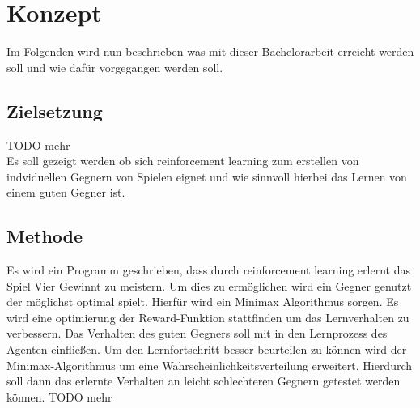 \chapter{Konzept}%

\label{cha:Konzept}

Im Folgenden wird nun beschrieben was mit dieser Bachelorarbeit erreicht werden soll und wie dafür vorgegangen werden soll.

\section{Zielsetzung}
\colorbox{red!30}{TODO mehr}\\
Es soll gezeigt werden ob sich reinforcement learning zum erstellen von indviduellen Gegnern von Spielen eignet und wie sinnvoll hierbei das Lernen von einem guten Gegner ist. \\

\section{Methode}
Es wird ein Programm geschrieben, dass durch reinforcement learning erlernt das Spiel Vier Gewinnt zu meistern. Um dies zu ermöglichen wird ein Gegner genutzt der möglichst optimal spielt. Hierfür wird ein Minimax Algorithmus sorgen. Es wird eine optimierung der Reward-Funktion stattfinden um das Lernverhalten zu verbessern. Das Verhalten des guten Gegners soll mit in den Lernprozess des Agenten einfließen. Um den Lernfortschritt besser beurteilen zu können wird der Minimax-Algorithmus um eine Wahrscheinlichkeitsverteilung erweitert. Hierdurch soll dann das erlernte Verhalten an leicht schlechteren Gegnern getestet werden können.
\colorbox{red!30}{TODO mehr}

